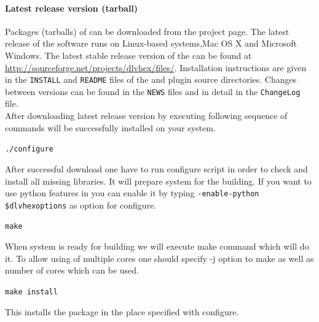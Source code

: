 \documentclass[14pt,a4paper, titlepage]{article}
\begin{document}
\paragraph{Latest release version (tarball)}
Packages (tarballs) of \dlvhex{} can be downloaded from the project page\cite{sourceforge}. The latest release of the software runs on Linux-based systems,Mac OS X and Microsoft Windows. The latest stable release version of the \dlvhex{} can be found at \url{http://sourceforge.net/projects/dlvhex/files/}. Installation instructions are given in the {\tt INSTALL} and {\tt README} files of the \dlvhex{} and plugin source directories. Changes between versions can be found in the {\tt NEWS} files and in detail in the {\tt ChangeLog} file.
\\ After downloading latest release version by executing following sequence of commands \dlvhex{} will be successfully installed on your system.
\\ \centerline{\texttt{./configure}} After successful download one have to run configure script in order to check and install all missing libraries. It will prepare system for the building. If you want to use python features in \dlvhex you can enable it by typing \texttt{-enable-python \$dlvhexoptions} as option for configure.
\\ \centerline{\texttt{make}} When system is ready for building we will execute make command which will do it. To allow using of multiple cores one should specify -j option to make as well as number of cores which can be used.
\\ \centerline{\texttt{make install}} This installs the package in the place specified with configure.  
   
\end{document}
